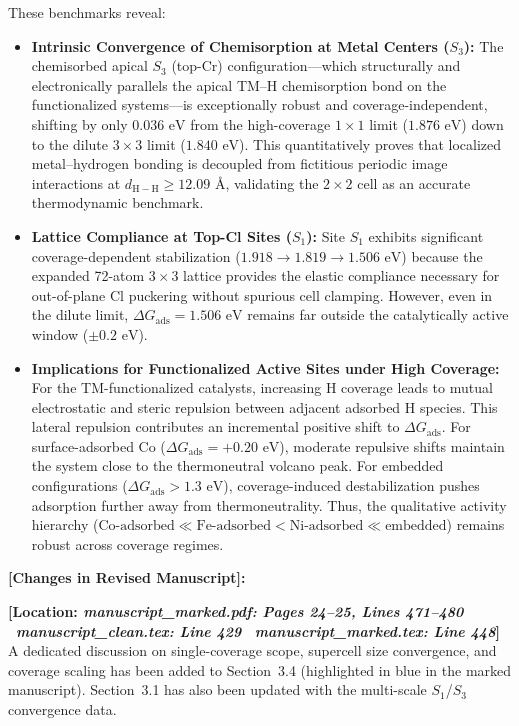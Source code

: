 \documentclass[11pt, sans, a4paper]{moderncv}
\newcommand{\manuscriptchange}[1]{\vspace{0.4em}\noindent\textbf{\color{acsblue}[Changes in Revised Manuscript]:}\par\nopagebreak\vspace{0.15em}#1\vspace{0.4em}}
\begin{document}
These benchmarks reveal:
\begin{itemize}[leftmargin=1.5em, itemsep=0.2em]
\item \textbf{Intrinsic Convergence of Chemisorption at Metal Centers ($S_3$):} The chemisorbed apical $S_3$ (top-Cr) configuration—which structurally and electronically parallels the apical TM--H chemisorption bond on the functionalized systems—is exceptionally robust and coverage-independent, shifting by only $0.036\text{ eV}$ from the high-coverage $1\times 1$ limit ($1.876\text{ eV}$) down to the dilute $3\times 3$ limit ($1.840\text{ eV}$). This quantitatively proves that localized metal--hydrogen bonding is decoupled from fictitious periodic image interactions at $d_{\mathrm{H-H}} \ge 12.09\text{ \AA}$, validating the $2\times 2$ cell as an accurate thermodynamic benchmark.
\item \textbf{Lattice Compliance at Top-Cl Sites ($S_1$):} Site $S_1$ exhibits significant coverage-dependent stabilization ($1.918 \rightarrow 1.819 \rightarrow 1.506\text{ eV}$) because the expanded 72-atom $3\times 3$ lattice provides the elastic compliance necessary for out-of-plane Cl puckering without spurious cell clamping. However, even in the dilute limit, $\Delta G_{\mathrm{ads}} = 1.506\text{ eV}$ remains far outside the catalytically active window ($\pm 0.2\text{ eV}$).
\item \textbf{Implications for Functionalized Active Sites under High Coverage:} For the TM-functionalized catalysts, increasing H coverage leads to mutual electrostatic and steric repulsion between adjacent adsorbed H species. This lateral repulsion contributes an incremental positive shift to $\Delta G_{\mathrm{ads}}$. For surface-adsorbed Co ($\Delta G_{\mathrm{ads}} = +0.20\text{ eV}$), moderate repulsive shifts maintain the system close to the thermoneutral volcano peak. For embedded configurations ($\Delta G_{\mathrm{ads}} > 1.3\text{ eV}$), coverage-induced destabilization pushes adsorption further away from thermoneutrality. Thus, the qualitative activity hierarchy ($\text{Co-adsorbed} \ll \text{Fe-adsorbed} < \text{Ni-adsorbed} \ll \text{embedded}$) remains robust across coverage regimes.
\end{itemize}

\manuscriptchange{\textbf{[Location: \textit{manuscript\_marked.pdf: Pages 24--25, Lines 471--480} \textbar\ \textit{manuscript\_clean.tex: Line 429} \textbar\ \textit{manuscript\_marked.tex: Line 448}]}\\ A dedicated discussion on single-coverage scope, supercell size convergence, and coverage scaling has been added to Section~3.4 (highlighted in blue in the marked manuscript). Section~3.1 has also been updated with the multi-scale $S_1$/$S_3$ convergence data.}
\end{document}
